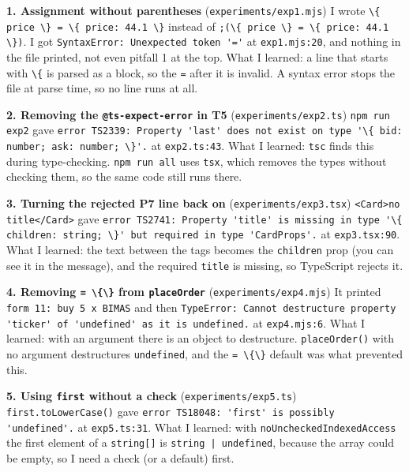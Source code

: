 \documentclass[
  11pt,
]{article}
\newcommand{\passthrough}[1]{#1}
\begin{document}
\textbf{1. Assignment without parentheses}
(\passthrough{\lstinline!experiments/exp1.mjs!}) I wrote
\passthrough{\lstinline!\{ price \} = \{ price: 44.1 \}!} instead of
\passthrough{\lstinline!;(\{ price \} = \{ price: 44.1 \})!}. I got
\passthrough{\lstinline!SyntaxError: Unexpected token '='!} at
\passthrough{\lstinline!exp1.mjs:20!}, and nothing in the file printed,
not even pitfall 1 at the top. What I learned: a line that starts with
\passthrough{\lstinline!\{!} is parsed as a block, so the
\passthrough{\lstinline!=!} after it is invalid. A syntax error stops
the file at parse time, so no line runs at all.

\textbf{2. Removing the \passthrough{\lstinline!@ts-expect-error!} in
T5} (\passthrough{\lstinline!experiments/exp2.ts!})
\passthrough{\lstinline!npm run exp2!} gave
\passthrough{\lstinline!error TS2339: Property 'last' does not exist on type '\{ bid: number; ask: number; \}'.!}
at \passthrough{\lstinline!exp2.ts:43!}. What I learned:
\passthrough{\lstinline!tsc!} finds this during type-checking.
\passthrough{\lstinline!npm run all!} uses
\passthrough{\lstinline!tsx!}, which removes the types without checking
them, so the same code still runs there.

\textbf{3. Turning the rejected P7 line back on}
(\passthrough{\lstinline!experiments/exp3.tsx!})
\passthrough{\lstinline!<Card>no title</Card>!} gave
\passthrough{\lstinline!error TS2741: Property 'title' is missing in type '\{ children: string; \}' but required in type 'CardProps'.!}
at \passthrough{\lstinline!exp3.tsx:90!}. What I learned: the text
between the tags becomes the \passthrough{\lstinline!children!} prop
(you can see it in the message), and the required
\passthrough{\lstinline!title!} is missing, so TypeScript rejects it.

\textbf{4. Removing \passthrough{\lstinline!= \{\}!} from
\passthrough{\lstinline!placeOrder!}}
(\passthrough{\lstinline!experiments/exp4.mjs!}) It printed
\passthrough{\lstinline!form 11: buy 5 x BIMAS!} and then
\passthrough{\lstinline!TypeError: Cannot destructure property 'ticker' of 'undefined' as it is undefined.!}
at \passthrough{\lstinline!exp4.mjs:6!}. What I learned: with an
argument there is an object to destructure.
\passthrough{\lstinline!placeOrder()!} with no argument destructures
\passthrough{\lstinline!undefined!}, and the
\passthrough{\lstinline!= \{\}!} default was what prevented this.

\textbf{5. Using \passthrough{\lstinline!first!} without a check}
(\passthrough{\lstinline!experiments/exp5.ts!})
\passthrough{\lstinline!first.toLowerCase()!} gave
\passthrough{\lstinline!error TS18048: 'first' is possibly 'undefined'.!}
at \passthrough{\lstinline!exp5.ts:31!}. What I learned: with
\passthrough{\lstinline!noUncheckedIndexedAccess!} the first element of
a \passthrough{\lstinline!string[]!} is
\passthrough{\lstinline!string | undefined!}, because the array could be
empty, so I need a check (or a default) first.
\end{document}
